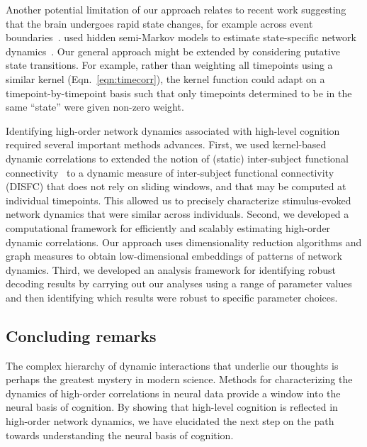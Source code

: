 \documentclass[english]{article}
\begin{document}
Another potential limitation of our approach relates to recent work
suggesting that the brain undergoes rapid state changes, for example
across event boundaries~\citep[e.g.,][]{BaldEtal17}.
\cite{ShapEtal19} used hidden semi-Markov models to estimate
state-specific network dynamics~\citep[also see][]{VidaEtal18}.  Our
general approach might be extended by considering putative state
transitions. For example, rather than weighting all timepoints using a
similar kernel (Eqn.~\ref{eqn:timecorr}), the kernel function could
adapt on a timepoint-by-timepoint basis such that only timepoints
determined to be in the same ``state'' were given non-zero weight.

Identifying high-order network dynamics associated with high-level
cognition required several important methods advances.  First, we used
kernel-based dynamic correlations to extended the notion of (static)
inter-subject functional connectivity~\citep{SimoEtal16} to a dynamic
measure of inter-subject functional connectivity (DISFC) that does not
rely on sliding windows, and that may be computed at individual
timepoints.  This allowed us to precisely characterize stimulus-evoked
network dynamics that were similar across individuals.  Second, we
developed a computational framework for efficiently and scalably estimating
high-order dynamic correlations.  Our approach uses dimensionality
reduction algorithms and graph measures to obtain low-dimensional
embeddings of patterns of network dynamics.  Third, we developed an
analysis framework for identifying robust decoding results by carrying
out our analyses using a range of parameter values and then
identifying which results were robust to specific parameter choices.

\subsection*{Concluding remarks}
The complex hierarchy of dynamic interactions that underlie our
thoughts is perhaps the greatest mystery in modern science.  Methods
for characterizing the dynamics of high-order correlations in neural
data provide a window into the neural basis of cognition.  By showing
that high-level cognition is reflected in high-order network dynamics,
we have elucidated the next step on the path towards understanding the
neural basis of cognition.
\end{document}
